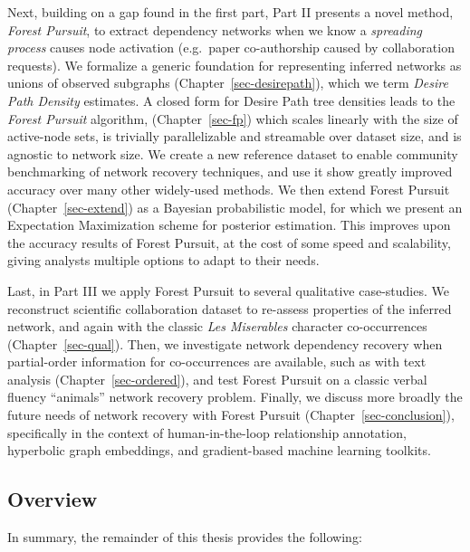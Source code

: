 \documentclass[%
	12pt,
		oneside,
		letterpaper
]{book}
\begin{document}
Next, building on a gap found in the first part, Part II presents a novel method, \emph{Forest Pursuit}, to extract dependency networks when we know a \emph{spreading process} causes node activation (e.g.~paper co-authorship caused by collaboration requests).
We formalize a generic foundation for representing inferred networks as unions of observed subgraphs (Chapter~\ref{sec-desirepath}), which we term \emph{Desire Path Density} estimates.
A closed form for Desire Path tree densities leads to the \emph{Forest Pursuit} algorithm, (Chapter~\ref{sec-fp}) which scales linearly with the size of active-node sets, is trivially parallelizable and streamable over dataset size, and is agnostic to network size.
We create a new reference dataset to enable community benchmarking of network recovery techniques, and use it show greatly improved accuracy over many other widely-used methods.
We then extend Forest Pursuit (Chapter~\ref{sec-extend}) as a Bayesian probabilistic model, for which we present an Expectation Maximization scheme for posterior estimation.
This improves upon the accuracy results of Forest Pursuit, at the cost of some speed and scalability, giving analysts multiple options to adapt to their needs.

Last, in Part III we apply Forest Pursuit to several qualitative case-studies.
We reconstruct scientific collaboration dataset to re-assess properties of the inferred network, and again with the classic \emph{Les Miserables} character co-occurrences (Chapter~\ref{sec-qual}).
Then, we investigate network dependency recovery when partial-order information for co-occurrences are available, such as with text analysis (Chapter~\ref{sec-ordered}), and test Forest Pursuit on a classic verbal fluency ``animals'' network recovery problem.
Finally, we discuss more broadly the future needs of network recovery with Forest Pursuit (Chapter~\ref{sec-conclusion}), specifically in the context of human-in-the-loop relationship annotation, hyperbolic graph embeddings, and gradient-based machine learning toolkits.

\subsection{Overview}\label{overview}

In summary, the remainder of this thesis provides the following:
\end{document}
